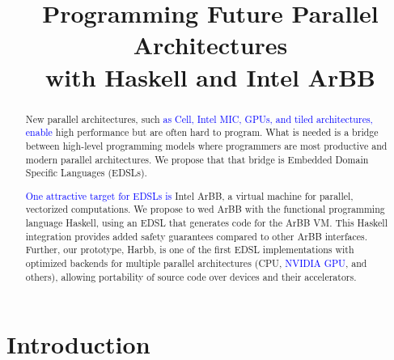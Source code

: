 \documentclass[conference]{IEEEtran}
\newcommand{\new}[1]{\textcolor{blue}{#1}}
\newcommand{\new}[1]{#1}
\newcommand{\systemname}[0]{{Harbb}}
\begin{document}
\title{Programming Future Parallel Architectures\\ with Haskell and Intel ArBB}

\author{
\and
{}
}

\maketitle

\begin{abstract}
%
New parallel architectures, such 
\new{as Cell, Intel MIC, GPUs, and tiled architectures, enable} high
performance but are often hard to program.
What is needed is a bridge between high-level programming models 
where programmers are most productive and modern parallel architectures. 
We propose that that bridge is Embedded Domain Specific Languages (EDSLs). 

\new{One attractive target for EDSLs is}
Intel ArBB, a virtual machine for parallel, vectorized computations.
We propose to wed ArBB with the functional programming language
Haskell, {using an EDSL} that generates code for the ArBB VM.  This Haskell integration provides 
added safety guarantees compared to other ArBB interfaces.
%
Further, our prototype, \systemname{}, is one of the first EDSL implementations with
optimized backends for multiple parallel architectures (CPU, \new{NVIDIA GPU}, and
others), allowing portability of source code over devices
and their accelerators.


\end{abstract}
\IEEEpeerreviewmaketitle




\section{Introduction}
\end{document}
